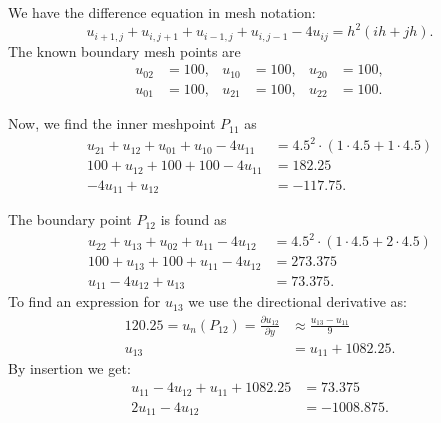 \begin{derivation}
  We have the difference equation in mesh notation:
  \begin{equation*}
    u_{i+1,j} + u_{i,j+1} + u_{i-1,j} + u_{i,j-1} - 4u_{ij} = h^2(ih + jh)
  .\end{equation*}
  The known boundary mesh points are
  \begin{align*}
    u_{02} &= 100, & u_{10} &= 100, & u_{20} &= 100, \\
    u_{01} &= 100, & u_{21} &= 100, & u_{22} &= 100
  .\end{align*}

  Now, we find the inner meshpoint $P_{11}$ as
  \begin{align*}
    u_{21} + u_{12} + u_{01} + u_{10} - 4u_{11} &= \num{4,5}^2 \cdot \left( 1 \cdot \num{4,5} + 1 \cdot \num{4,5}  \right) \\
      100 + u_{12} + 100 + 100 - 4u_{11} &= \num{182,25} \\
      -4u_{11} + u_{12} &= \num{-117,75} 
  .\end{align*}

  The boundary point $P_{12}$ is found as
  \begin{align*}
    u_{22} + u_{13} + u_{02} + u_{11} - 4u_{12} &= \num{4,5}^2 \cdot (1 \cdot \num{4,5}  + 2\cdot \num{4,5} ) \\
    100 + u_{13} + 100 + u_{11} - 4u_{12} &= \num{273,375}  \\
    u_{11} - 4u_{12} + u_{13} &= \num{73,375} 
  .\end{align*}
  To find an expression for $u_{13}$ we use the directional derivative as:
  \begin{align*}
    \num{120,25} = u_n(P_{12}) = \frac{\partial u_{12}}{\partial y} &\approx \frac{u_{13} - u_{11}}{9} \\
    u_{13} &= u_{11} + \num{1082,25} 
  .\end{align*}
  By insertion we get:
  \begin{align*}
    u_{11} - 4u_{12} + u_{11} + \num{1082,25}  &= \num{73,375}  \\
    2u_{11} - 4u_{12} &= \num{-1008,875} 
  .\end{align*}
\end{derivation}



